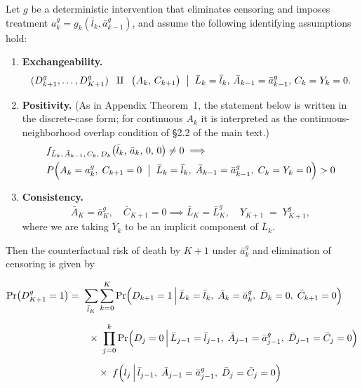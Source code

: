 \begin{tcolorbox}[title=Corollary 3: g-formula for competing event]

    Let $g$ be a deterministic intervention that eliminates censoring and imposes treatment $a^g_k = g_k(\bar{l}_k,\bar{a}^g_{k-1})$, and assume the following identifying assumptions hold:
    \begin{enumerate}
        \item \textbf{Exchangeability.}  
          \[
             (D_{k+1}^g,\ldots,D_{K+1}^g)
             \;\;\amalg\;\; \bigl(A_k, \,C_{k+1}\bigr)
             \;\bigm|\; \bar{L}_k = \bar{l}_k, \,\bar{A}_{k-1} = \bar{a}^g_{k-1},\,C_k=Y_k=0.
          \]
    
        \item \textbf{Positivity.}
          (As in Appendix Theorem~1, the statement below is written in the discrete-case form;
          for continuous \(A_k\) it is interpreted as the continuous-neighborhood overlap
          condition of \S 2.2 of the main text.)
          \begin{align*}
                  & f_{\bar{L}_k,\,\bar{A}_{k-1},\,C_k,\,D_k}\bigl(\bar{l}_k,\,\bar{a}_k,\,0,\,0\bigr)\neq 0  \implies  \\
                  & P\Bigl(A_k = a^g_k,\; C_{k+1}=0 \;\bigm|\; \bar{L}_k=\bar{l}_k,\; \bar{A}_{k-1}=\bar{a}^g_{k-1},\; C_k = Y_k = 0\Bigr) > 0
          \end{align*}
    
    
        \item \textbf{Consistency.}   
          \[\bar{A}_K = \bar{a}^g_K, \quad \bar{C}_{K+1}=0 \implies   \bar{L}_K =\bar{L}_K^g, \quad Y_{K+1} \;=\;Y_{K+1}^g,\] 
        where we are taking $\bar{Y}_k$ to be an implicit component of $\bar{L}_k$. 
    \end{enumerate}

    Then the counterfactual risk of death by $K+1$ under $\bar{a}^g_k$ and elimination of censoring is given by
  
    \begin{align*}
      \Pr\bigl(D_{K+1}^{g} = 1\bigr)
      &=\;
      \sum_{\bar{l}_K} \sum_{k=0}^K 
          \Pr\Bigl(D_{k+1} = 1 \,\Big|\,\bar{L}_k = \bar{l}_k,\;\bar{A}_k=\bar{a}^g_k,\; \bar{D}_k=0,\;\bar{C}_{k+1}=0 \Bigr) \\[6pt]
      &\quad\quad \times\;
      \prod_{j=0}^{k} \Pr\Bigl(D_j=0 \,\Big|\, \bar{L}_{j-1} = \bar{l}_{j-1},\;\bar{A}_{j-1} = \bar{a}^g_{j-1},\;\bar{D}_{j-1} = \bar{C}_j = 0 \Bigr) \\[6pt]
      &\quad\quad\quad \times\;
        f\Bigl(l_j \,\Big|\,\bar{l}_{j-1},\;\bar{A}_{j-1} = \bar{a}^g_{j-1},\; \bar{D}_{j} =\bar{C}_j = 0 \Bigr)
    \end{align*}
    

\end{tcolorbox}
